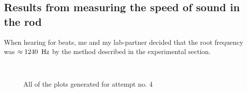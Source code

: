 \documentclass[11pt,a4paper]{article}
\begin{document}
  \subsection{Results from measuring the speed of sound in the rod}

    When hearing for beats, me and my lab-partner decided that the root frequency was $\approx 1240\enspace\textup{Hz}$ by the method described in the experimental section.
    \newline
    \begin{figure}[H]
      \centering
       \\
      \caption{All of the plots generated for attempt no. 4}
      \label{fig:sound_exp1}
    \end{figure}
\end{document}
